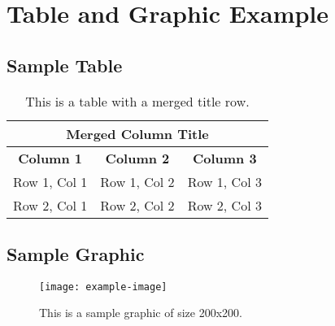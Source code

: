 \documentclass{article}
\begin{document}
\section*{Table and Graphic Example}

\subsection*{Sample Table}

\begin{table}[ht]
    \centering
    \begin{tabular}{|c|c|c|}
        \hline
        \multicolumn{3}{|c|}{\textbf{Merged Column Title}} \\ \hline
        \textbf{Column 1} & \textbf{Column 2} & \textbf{Column 3} \\ \hline
        Row 1, Col 1 & Row 1, Col 2 & Row 1, Col 3 \\ \hline
        Row 2, Col 1 & Row 2, Col 2 & Row 2, Col 3 \\ \hline
    \end{tabular}
    \caption{This is a table with a merged title row.}
\end{table}

\vspace{1cm}

\subsection*{Sample Graphic}

\begin{figure}[ht]
    \centering
    \texttt{[image: example-image]} %
    \caption{This is a sample graphic of size 200x200.}
\end{figure}
\end{document}

